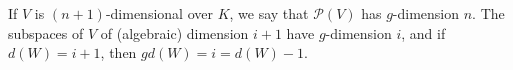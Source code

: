 If $V$ is $(n+1)$-dimensional over $K$, we say that $\mathcal{P}(V)$ has $g$-dimension $n$. The subspaces of $V$ of (algebraic) dimension $i+1$ have $g$-dimension $i$, and if $d(W)=i+1$, then $gd(W)=i=d(W)-1$.
